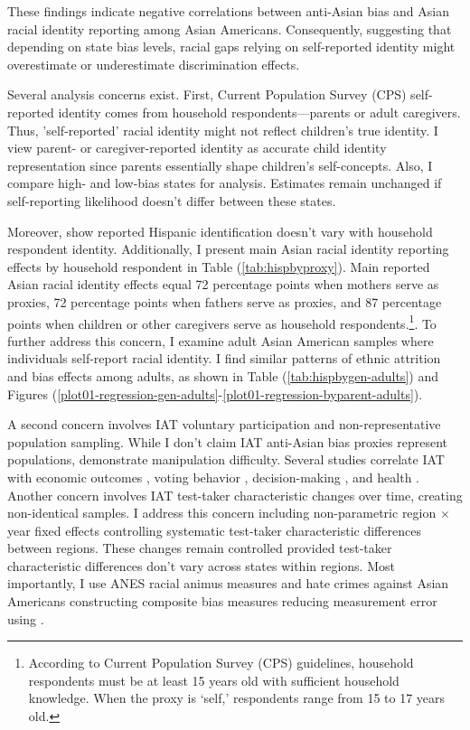These findings indicate negative correlations between anti-Asian bias and Asian racial identity reporting among Asian Americans. Consequently, suggesting that depending on state bias levels, racial gaps relying on self-reported identity might overestimate or underestimate discrimination effects.

Several analysis concerns exist. First, Current Population Survey (CPS) self-reported identity comes from household respondents—parents or adult caregivers. Thus, 'self-reported' racial identity might not reflect children's true identity. I view parent- or caregiver-reported identity as accurate child identity representation since parents essentially shape children's self-concepts. Also, I compare high- and low-bias states for analysis. Estimates remain unchanged if self-reporting likelihood doesn't differ between these states.

Moreover, \textcite{duncanIntermarriageIntergenerationalTransmission2011} show reported Hispanic identification doesn't vary with household respondent identity. Additionally, I present main Asian racial identity reporting effects by household respondent in Table (\ref{tab:hispbyproxy}). Main reported Asian racial identity effects equal 72 percentage points when mothers serve as proxies, 72 percentage points when fathers serve as proxies, and 87 percentage points when children or other caregivers serve as household respondents.\footnote{According to Current Population Survey (CPS) guidelines, household respondents must be at least 15 years old with sufficient household knowledge. When the proxy is `self,' respondents range from 15 to 17 years old.}. To further address this concern, I examine adult Asian American samples where individuals self-report racial identity. I find similar patterns of ethnic attrition and bias effects among adults, as shown in Table (\ref{tab:hispbygen-adults}) and Figures (\ref{plot01-regression-gen-adults}-\ref{plot01-regression-byparent-adults}).

A second concern involves IAT voluntary participation and non-representative population sampling. While I don't claim IAT anti-Asian bias proxies represent populations, \textcite{egloffPredictiveValidityImplicit2002} demonstrate manipulation difficulty. Several studies correlate IAT with economic outcomes \autocite{chettyRaceEconomicOpportunity2020,gloverDiscriminationSelfFulfillingProphecy2017}, voting behavior \autocite{friesePredictingVotingBehavior2007}, decision-making \autocite{bertrandImplicitDiscrimination2005,carlanaImplicitStereotypesEvidence2019}, and health \autocite{leitnerRacialBiasAssociated2016}. Another concern involves IAT test-taker characteristic changes over time, creating non-identical samples. I address this concern including non-parametric region $\times$ year fixed effects controlling systematic test-taker characteristic differences between regions. These changes remain controlled provided test-taker characteristic differences don't vary across states within regions. Most importantly, I use ANES racial animus measures and hate crimes against Asian Americans constructing composite bias measures reducing measurement error using \textcite{lubotskyInterpretationRegressionsMultiple2006}.

